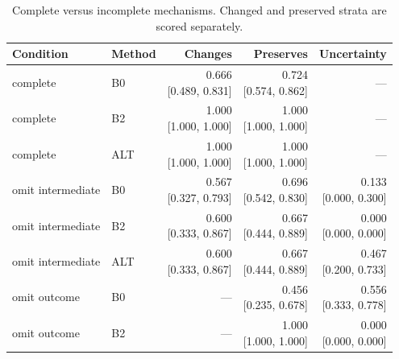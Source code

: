 \begin{table}[t]\centering\small\setlength{\tabcolsep}{3pt}

\caption{Complete versus incomplete mechanisms. Changed and preserved strata are scored separately.}\label{tab:missing}

\begin{tabular}{llrrr}\toprule Condition & Method & Changes & Preserves & Uncertainty\\\midrule

complete & B0 & \shortstack{0.666\\{[0.489, 0.831]}} & \shortstack{0.724\\{[0.574, 0.862]}} & ---\\

complete & B2 & \shortstack{1.000\\{[1.000, 1.000]}} & \shortstack{1.000\\{[1.000, 1.000]}} & ---\\

complete & ALT & \shortstack{1.000\\{[1.000, 1.000]}} & \shortstack{1.000\\{[1.000, 1.000]}} & ---\\

omit intermediate & B0 & \shortstack{0.567\\{[0.327, 0.793]}} & \shortstack{0.696\\{[0.542, 0.830]}} & \shortstack{0.133\\{[0.000, 0.300]}}\\

omit intermediate & B2 & \shortstack{0.600\\{[0.333, 0.867]}} & \shortstack{0.667\\{[0.444, 0.889]}} & \shortstack{0.000\\{[0.000, 0.000]}}\\

omit intermediate & ALT & \shortstack{0.600\\{[0.333, 0.867]}} & \shortstack{0.667\\{[0.444, 0.889]}} & \shortstack{0.467\\{[0.200, 0.733]}}\\

omit outcome & B0 & --- & \shortstack{0.456\\{[0.235, 0.678]}} & \shortstack{0.556\\{[0.333, 0.778]}}\\

omit outcome & B2 & --- & \shortstack{1.000\\{[1.000, 1.000]}} & \shortstack{0.000\\{[0.000, 0.000]}}\\


\end{tabular}
\end{table}
